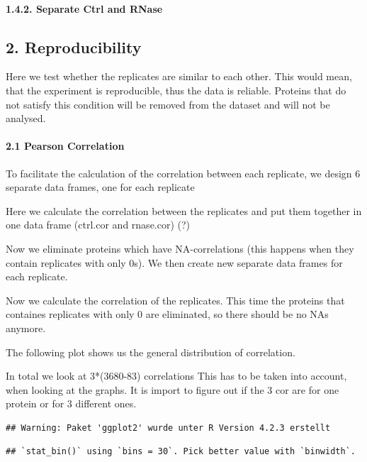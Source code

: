 \documentclass[
]{article}
\begin{document}
\hypertarget{separate-ctrl-and-rnase}{%
\paragraph{1.4.2. Separate Ctrl and
RNase}\label{separate-ctrl-and-rnase}}

\hypertarget{reproducibility}{%
\subsection{2. Reproducibility}\label{reproducibility}}

Here we test whether the replicates are similar to each other. This
would mean, that the experiment is reproducible, thus the data is
reliable. Proteins that do not satisfy this condition will be removed
from the dataset and will not be analysed.

\hypertarget{pearson-correlation}{%
\paragraph{2.1 Pearson Correlation}\label{pearson-correlation}}

To facilitate the calculation of the correlation between each replicate,
we design 6 separate data frames, one for each replicate

Here we calculate the correlation between the replicates and put them
together in one data frame (ctrl.cor and rnase.cor) (?)

Now we eliminate proteins which have NA-correlations (this happens when
they contain replicates with only 0s). We then create new separate data
frames for each replicate.

Now we calculate the correlation of the replicates. This time the
proteins that containes replicates with only 0 are eliminated, so there
should be no NAs anymore.

The following plot shows us the general distribution of correlation.

In total we look at 3*(3680-83) correlations This has to be taken into
account, when looking at the graphs. It is import to figure out if the 3
cor are for one protein or for 3 different ones.

\begin{verbatim}
## Warning: Paket 'ggplot2' wurde unter R Version 4.2.3 erstellt
\end{verbatim}

\begin{verbatim}
## `stat_bin()` using `bins = 30`. Pick better value with `binwidth`.
\end{verbatim}
\end{document}
